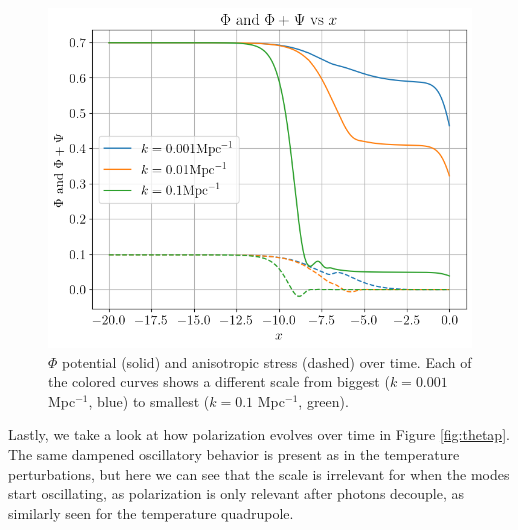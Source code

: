 \documentclass{aa}
\begin{document}
\begin{figure}[ht]
    \centering
    \includegraphics[width=\hsize]{report/figures/Phi_Psi.png}
    \caption{$\Phi$ potential (solid) and anisotropic stress (dashed) over time. Each of the colored curves shows a different scale from biggest ($k = 0.001$ Mpc$^{-1}$, blue) to smallest ($k=0.1$ Mpc$^{-1}$, green).}
    \label{fig:potentials}
\end{figure}

Lastly, we take a look at how polarization evolves over time in Figure \ref{fig:thetap}. The same dampened oscillatory behavior is present as in the temperature perturbations, but here we can see that the scale is irrelevant for when the modes start oscillating, as polarization is only relevant after photons decouple, as similarly seen for the temperature quadrupole.
\end{document}
